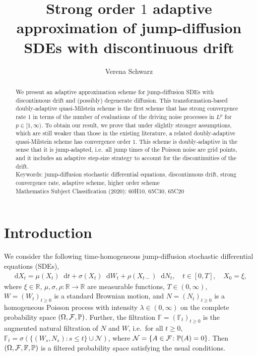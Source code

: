 \documentclass[11pt,a4paper]{article}
\title{Strong order $1$ adaptive approximation of jump-diffusion SDEs with discontinuous drift}
\author{Verena Schwarz}
\date{}
\numberwithin{equation}{section}
\theoremstyle{definition}
\renewcommand{\P}{{\mathbb{P}}}
\newcommand{\R}{{\mathbb{R}}}
\newcommand{\cF}{{\cal F}}
\newcommand{\diff}{\mathop{}\!\mathrm{d}}
\begin{document}
\maketitle

\begin{abstract}
We present an adaptive approximation scheme for jump-diffusion SDEs with discontinuous drift and (possibly) degenerate diffusion.
This transformation-based doubly-adaptive quasi-Milstein scheme is the first scheme that has strong convergence rate $1$ in terms of the number of evaluations of the driving noise processes in $L^p$ for $p\in[1,\infty)$. 
To obtain our result, we prove that under slightly stronger assumptions, which are still weaker than those in the existing literature, a related doubly-adaptive quasi-Milstein scheme has convergence order $1$. 
This scheme is doubly-adaptive in the sense that it is jump-adapted, i.e.~all jump times of the Poisson noise are grid points, and it includes an adaptive step-size strategy to account for the discontinuities of the drift. \\
\noindent Keywords: jump-diffusion stochastic differential equations, discontinuous drift, strong convergence rate, adaptive scheme, higher order scheme\\
Mathematics Subject Classification (2020): 60H10, 65C30, 65C20
\end{abstract}


\section{Introduction}\label{sec:intro}

We consider the following time-homogeneous jump-diffusion stochastic differential equations (SDEs),
\begin{equation}\label{eq:SDE}
\begin{aligned}
\diff X_t = \mu(X_t) \diff t + \sigma(X_t)\diff W_t + \rho(X_{t-}) \diff N_t, \quad t\in[0,T],\quad X_0 =\xi,
\end{aligned}
\end{equation}
where $\xi\in\R$, $\mu,\sigma,\rho\colon\R\to \R$ are measurable functions, $T\in(0,\infty)$, $W=(W_t)_{t\geq 0}$ is a
standard Brownian motion, and  $N= (N_t)_{t\geq 0}$ is a homogeneous Poisson process with intensity $\lambda \in (0,\infty)$ on the complete probability space $(\Omega,\cF,\P)$. Further, the filtration $\mathbb{F}=(\mathbb{F}_t)_{t\geq 0}$ is the augmented natural filtration of $N$ and $W$, i.e.~for all $t\geq 0$, $\mathbb{F}_t = \sigma(\{(W_s,N_s) \colon s\leq t\}\cup \mathcal{N})$, where $\mathcal N = \{A\in \cF\colon \P(A)=0\}$. Then $(\Omega,\cF,\mathbb{F},\P)$ is a filtered probability space satisfying the usual conditions. 
\end{document}
